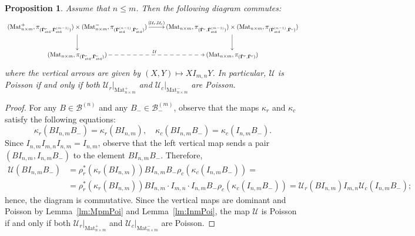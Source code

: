 \documentclass[11pt]{article}
\newcommand{\bbg}{\bar{\mathbf{\Gamma}}}
\newcommand{\std}{\mathrm{std}}
\DeclareMathOperator{\Mat}{Mat}
\newtheorem{proposition}[theorem]{Proposition}%
\theoremstyle{definition}\newtheorem{definition}[theorem]{Definition}
\theoremstyle{definition}\newtheorem{remark}[theorem]{Remark}
\theoremstyle{remark}
\numberwithin{equation}{section}
\begin{document}
\begin{proposition}\label{p:Ufac}
    Assume that $n \leq m$. Then the following diagram commutes:
   \begin{equation}\label{eq:Ufac}
        \scalebox{0.86}{$\xymatrix{
            (\Mat_{n\times m}^+,\pi_{(\bbg^r_{\std},\bbg_{\std}^{(m-1)})})\times (\Mat_{n\times m}^-,\pi_{(\bbg_{\std}^{(n-1)},\bbg^c_{\std})}) \ar[d] \ar[r]^-{(\mathcal{U}_r,\mathcal{U}_c)} & (\Mat_{n\times m},\pi_{(\bbg^r,\bbg_{\std}^{(m-1)})})\times (\Mat_{n\times m},\pi_{(\bbg_{\std}^{(n-1)},\bbg^c)}) \ar[d]\\
            (\Mat_{n\times m},\pi_{(\bbg^r_{\std},\bbg^c_{\std})}) \ar@{-->}[r]^{\mathcal{U}} & (\Mat_{n\times m},\pi_{(\bbg^r,\bbg^c)})
        }$}
    \end{equation}
    where the vertical arrows are given by $(X,Y) \mapsto XI_{m,n}Y$. In particular, $\mathcal{U}$ is Poisson if and only if both $\mathcal{U}_r|_{\Mat_{n\times m}^+}$ and $\mathcal{U}_c|_{\Mat_{n\times m}^-}$ are Poisson.
\end{proposition}
\begin{proof}
    For any $B \in \mathcal{B}^{(n)}$ and any $B_- \in \mathcal{B}_-^{(m)}$, observe that the maps $\kappa_r$ and $\kappa_c$ satisfy the following equations:
    \begin{equation*}
        \kappa_r(BI_{n,m}B_-) = \kappa_r(BI_{n,m}), \quad \kappa_c(BI_{n,m}B_-) = \kappa_c(I_{n,m}B_-).
    \end{equation*}
    Since $I_{n,m}I_{m,n}I_{n,m} = I_{n,m}$, observe that the left vertical map sends a pair $(BI_{n,m}, I_{n,m}B_-)$ to the element $BI_{n,m}B_-$. Therefore,
    \begin{equation*}\begin{split}
        \mathcal{U}(BI_{n,m}B_-) &= \rho_r^*(\kappa_r(BI_{n,m}))BI_{n,m}B_-\rho_c(\kappa_c(I_{n,m}B_-)) = \\ &= \rho_r^*(\kappa_r(BI_{n,m}))BI_{n,m}\cdot I_{m,n}\cdot I_{n,m}B_-\rho_c(\kappa_c(I_{n,m}B_-)) = \mathcal{U}_r(BI_{n,m})I_{m,n}\mathcal{U}_c(I_{n,m}B_-);
        \end{split}
    \end{equation*}
    hence, the diagram is commutative. Since the vertical maps are dominant and Poisson by Lemma~\ref{lm:MpmPoi} and Lemma~\ref{lm:InmPoi}, the map $\mathcal{U}$ is Poisson if and only if both $\mathcal{U}_r|_{\Mat_{n\times m}^+}$ and $\mathcal{U}_c|_{\Mat_{n\times m}^-}$ are Poisson.
\end{proof}
\end{document}
